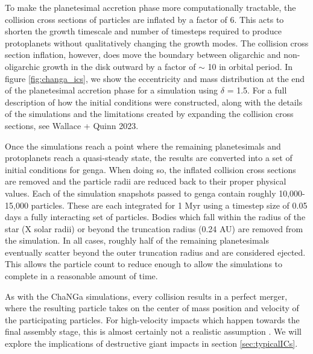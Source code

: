 To make the planetesimal accretion phase more computationally tractable, the collision cross sections of particles are inflated by a factor of 6. This acts to shorten the growth timescale and number of timesteps required to produce protoplanets without qualitatively changing the growth modes. The collision cross section inflation, however, does move the boundary between oligarchic and non-oligarchic growth in the disk outward by a factor of $\sim$ 10 in orbital period. In figure \ref{fig:changa_ics}, we show the eccentricity and mass distribution at the end of the planetesimal accretion phase for a simulation using $\delta$ = 1.5. For a full description of how the initial conditions were constructed, along with the details of the simulations and the limitations created by expanding the collision cross sections, see Wallace + Quinn 2023.

Once the simulations reach a point where the remaining planetesimals and protoplanets reach a quasi-steady state, the results are converted into a set of initial conditions for {\sc genga}.  When doing so, the inflated collision cross sections are removed and the particle radii are reduced back to their proper physical values. Each of the simulation snapshots passed to {\sc genga} contain roughly 10,000-15,000 particles. These are each integrated for 1 Myr using a timestep size of 0.05 days a fully interacting set of particles. Bodies which fall within the radius of the star (X solar radii) or beyond the truncation radius (0.24 AU) are removed from the simulation. In all cases, roughly half of the remaining planetesimals eventually scatter beyond the outer truncation radius and are considered ejected. This allows the particle count to reduce enough to allow the simulations to complete in a reasonable amount of time.

As with the {\sc ChaNGa} simulations, every collision results in a perfect merger, where the resulting particle takes on the center of mass position and velocity of the participating particles. For high-velocity impacts which happen towards the final assembly stage, this is almost certainly not a realistic assumption \cite{marcus09}. We will explore the implications of destructive giant impacts in section \ref{sec:typicalICs}.

